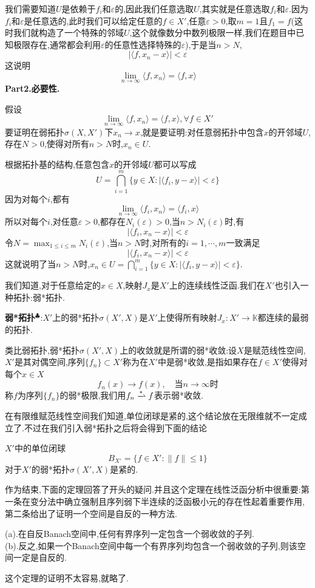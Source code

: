 我们需要知道$U$是依赖于$f_i$和$\varepsilon$的,因此我们任意选取$U$,其实就是任意选取$f_i$和$\varepsilon$.因为$f_i$和$\varepsilon$是任意选的,此时我们可以给定任意的$f\in X'$,任意$\varepsilon>0$,取$m=1$且$f_1=f$(这时我们就构造了一个特殊的邻域$U$,这个就像数分中数列极限一样,我们在题目中已知极限存在,通常都会利用$\varepsilon$的任意性选择特殊的$\varepsilon$),于是当$n>N$,
$$
|\langle f,x_n-x\rangle|<\varepsilon
$$
这说明
$$
\lim_{n\to \infty}\langle f,x_n\rangle=\langle f,x\rangle
$$
\qquad \textbf{Part2.必要性.}\par
假设
$$
\lim_{n\to \infty}\langle f,x_n\rangle=\langle f,x\rangle,\forall f\in X'
$$
要证明在弱拓扑$\sigma (X,X')$下$x_n\to x$,就是要证明:对任意弱拓扑中包含$x$的开邻域$U$,存在$N>0$,使得对所有$n>N$时,$x_n\in U$.\par
根据拓扑基的结构,任意包含$x$的开邻域$U$都可以写成
$$
U=\bigcap_{i=1}^m\{y\in X:|\langle f_i,y-x\rangle|<\varepsilon\}
$$
因为对每个$i$,都有
$$
\lim_{n\to \infty}\langle f_i,x_n\rangle=\langle f_i,x\rangle
$$
所以对每个$i$,对任意$\varepsilon>0$,都存在$N_i(\varepsilon)>0$,当$n>N_i(\varepsilon)$时,有
$$
|\langle f_i,x_n-x\rangle|<\varepsilon
$$
令$N=\max_{1\leqslant i\leqslant m}N_i(\varepsilon)$,当$n>N$时,对所有的$i=1,\cdots,m$一致满足
$$
|\langle f_i,x_n-x\rangle|<\varepsilon
$$
这就说明了当$n>N$时,$x_n\in U=\bigcap_{i=1}^m\{y\in X:|\langle f_i,y-x\rangle|<\varepsilon\}$.\par
我们知道,对于任意给定的$x\in X$,映射$J_x$是$X'$上的连续线性泛函.我们在$X'$也引入一种拓扑:弱*拓扑.\par
\textbf{弱*拓扑}$^\clubsuit $:$X'$上的弱*拓扑$\sigma (X',X)$是$X'$上使得所有映射$J_x:X'\to\mathbb{K}$都连续的最弱的拓扑.\par
类比弱拓扑,弱*拓扑$\sigma (X',X)$上的收敛就是所谓的弱*收敛:设$X$是赋范线性空间,$X'$是其对偶空间,序列$\{f_n\}\subset X'$称为在$X'$中是弱*收敛,是指如果存在$f\in X'$使得对每个$x\in X$
$$
f_n(x)\to f(x),\quad \text{当}n\to\infty\text{时}
$$
称$f$为序列$\{f_n\}$的弱*极限,我们用$f_n\xrightharpoonup{*} f$表示弱*收敛.\par
在有限维赋范线性空间我们知道,单位闭球是紧的,这个结论放在无限维就不一定成立了.不过在我们引入弱*拓扑之后将会得到下面的结论
\begin{tcolorbox}[colback=KuangNei,colframe=BianKuang,title=\textbf{Banach-Alaoglu定理 },sharpish corners]
$X'$中的单位闭球
$$
B_{X'}=\{f\in X':\|f\|\leqslant 1\}
$$
对于$X'$的弱*拓扑$\sigma(X',X)$是紧的.
\end{tcolorbox}
作为结束,下面的定理回答了开头的疑问.并且这个定理在线性泛函分析中很重要:第一条在变分法中确立强制且序列弱下半连续的泛函极小元的存在性起着重要作用,第二条给出了证明一个空间是自反的一种方法.
\begin{tcolorbox}[colback=KuangNei,colframe=BianKuang,title=\textbf{Banach-Eberlein-\v{S}mulian定理 },sharpish corners]
(a).在自反Banach空间中,任何有界序列一定包含一个弱收敛的子列.\\
(b).反之,如果一个Banach空间中每一个有界序列均包含一个弱收敛的子列,则该空间一定是自反的.
\end{tcolorbox}
这个定理的证明不太容易,就略了.

